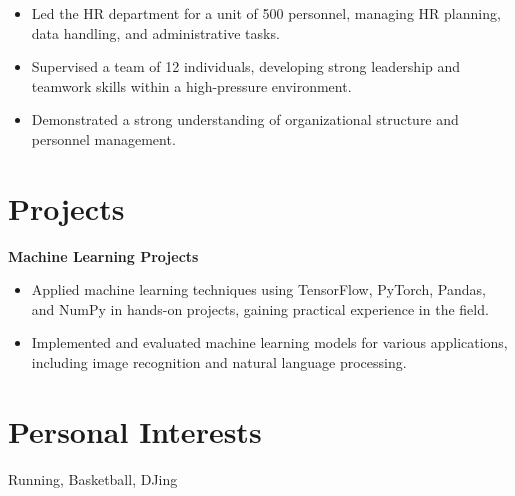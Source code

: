 \documentclass[a4paper,10pt]{article}
\begin{document}
\begin{itemize}[noitemsep]
\item Led the HR department for a unit of 500 personnel, managing HR planning, data handling, and administrative tasks.
\item Supervised a team of 12 individuals, developing strong leadership and teamwork skills within a high-pressure environment.
\item Demonstrated a strong understanding of organizational structure and personnel management.
\end{itemize}

\vspace{0.5cm}

\section{Projects}

\textbf{Machine Learning Projects}

\begin{itemize}[noitemsep]
\item Applied machine learning techniques using TensorFlow, PyTorch, Pandas, and NumPy in hands-on projects, gaining practical experience in the field.
\item Implemented and evaluated machine learning models for various applications, including image recognition and natural language processing.
\end{itemize}

\vspace{0.5cm}

\section{Personal Interests}

Running, Basketball, DJing
\end{document}
